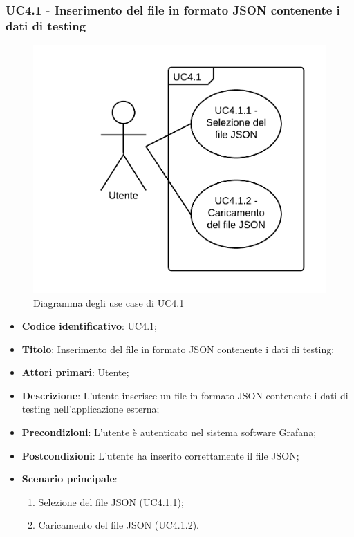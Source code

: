 \subsubsection{UC4.1 - Inserimento del file in formato JSON contenente i dati di testing}
\begin{figure}[H]
\includegraphics{img/UC4_1_-_Inserimento_del_file_in_formato_JSON_contenente_i_dati_di_testing.png}
\caption{Diagramma degli use case di UC4.1}
\end{figure}
\begin{itemize}
    \item \textbf{Codice identificativo}: UC4.1;
    \item \textbf{Titolo}: Inserimento del file in formato JSON contenente i dati di testing;
    \item \textbf{Attori primari}: Utente;
    \item \textbf{Descrizione}: L'utente inserisce un file in formato JSON contenente i dati di testing nell'applicazione esterna;
    \item \textbf{Precondizioni}: L'utente è autenticato nel sistema software Grafana\glo;
    \item \textbf{Postcondizioni}: L'utente ha inserito correttamente il file JSON;
    \item \textbf{Scenario principale}:
		\begin{enumerate}
			\item Selezione del file JSON (UC4.1.1);
			\item Caricamento del file JSON (UC4.1.2).
		\end{enumerate}
\end{itemize}

